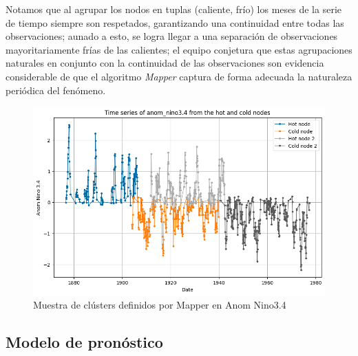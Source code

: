 \documentclass{article}
\begin{document}
            Notamos que al agrupar los nodos en tuplas (caliente, frío) los meses de la serie de tiempo siempre son respetados, garantizando una continuidad entre todas las observaciones; aunado a esto, se logra llegar a una separación de observaciones mayoritariamente frías de las calientes; el equipo conjetura que estas agrupaciones naturales en conjunto con la continuidad de las observaciones son evidencia considerable de que el algoritmo \textit{Mapper} captura de forma adecuada la naturaleza periódica del fenómeno.
            \begin{figure}[!htbp]
                \centering
                \includegraphics[scale=0.5]{mapper_periodicity.png}
                \caption{Muestra de clústers definidos por Mapper en Anom Nino3.4}
                \label{fig:mapper_periodicity}
            \end{figure}

        \subsection{Modelo de pronóstico}
\end{document}
